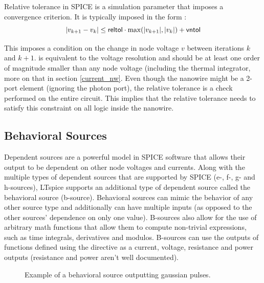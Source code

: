 
Relative tolerance in SPICE is a simulation parameter that imposes a convergence criterion.
It is typically imposed in the form \cite{accurate_sim_in_spice_kundert}:
$$|v_{k+1} - v_k| \leq \textnormal{\textsf{reltol}} \cdot \max(|v_{k+1}|, |v_k|) + \textnormal{\textsf{vntol}}$$

This imposes a condition on the change in node voltage $v$ between iterations $k$ and $k+1$.
 is equivalent to the voltage resolution and should be at least one order of magnitude
smaller than any node voltage (including the thermal integrator, more on that in section
\ref{current_nw}. Even though the nanowire might be a 2-port element (ignoring the photon port),
the relative tolerance is a check performed on the entire circuit. This implies that the relative
tolerance needs to satisfy this constraint on all logic inside the nanowire.

\subsection{Behavioral Sources}

Dependent sources are a powerful model in SPICE software that allows their output to be
dependent on other node voltages and currents. Along with the multiple types
of dependent sources that are supported by SPICE (e-, f-, g- and h-sources), LTspice
supports an additional type of dependent source called the behavioral source (b-source).
Behavioral sources can mimic the behavior of any other source type and additionally
can have multiple inputs (as opposed to the other sources' dependence on only one value).
B-sources also allow for the use of arbitrary math functions that allow them to compute
non-trivial expressions, such as time integrals, derivatives and modulos.
B-sources can use the outputs of functions defined using the  directive
as a current, voltage, resistance and power outputs (resistance and power aren't well 
documented). 

\begin{figure}
    \centering
    \caption{Example of a behavioral source outputting gaussian pulses.}
\end{figure}

